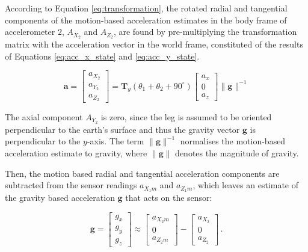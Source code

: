 \noindent
According to Equation \ref{eq:transformation}, the rotated radial and tangential components of the motion-based acceleration estimates in the body frame of accelerometer $2$, $A_{X_2}$ and $A_{Z_2}$, are found by pre-multiplying the transformation matrix with the acceleration vector in the world frame, constituted of the results of Equations \ref{eq:acc_x_state} and \ref{eq:acc_y_state}.

\begin{equation}
  \mathbf{a} = \begin{bmatrix}
  	a_{X_2} \\
  	a_{Y_2} \\
  	a_{Z_2}
  \end{bmatrix} = \mathbf{T}_y(\theta_1 + \theta_2 + 90^{\circ}) \begin{bmatrix}
  	a_x \\
  	0 \\
	a_z
  \end{bmatrix} \|\mathbf{g}\|^{-1}
\end{equation}

\noindent
The axial component $A_{Y_2}$ is zero, since the leg is assumed to be oriented perpendicular to the earth's surface and thus the gravity vector $\mathbf{g}$ is perpendicular to the $y$-axis. The term $\|\mathbf{g}\|^{-1}$ normalises the motion-based acceleration estimate to gravity, where $\|\mathbf{g}\|$ denotes the magnitude of gravity. 

Then, the motion based radial and tangential acceleration components are subtracted from the sensor readings $a_{X_1m}$ and $a_{Z_1m}$, which leaves an estimate of the gravity based acceleration $\mathbf{g}$ that acts on the sensor:

\begin{equation}
\mathbf{g} = \begin{bmatrix}
    g_x \\
    g_y \\
    g_z 
    \end{bmatrix} \approx 
    \begin{bmatrix}
    a_{X_2m} \\
    0 \\
    a_{Z_2m} 
    \end{bmatrix} -
    \begin{bmatrix}
    a_{X_2} \\
    0 \\
    a_{Z_2} 
    \end{bmatrix}\,.
\end{equation}

